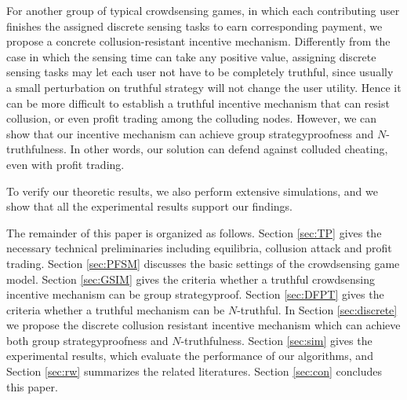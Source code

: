 \documentclass[conference]{IEEEtran}
\theoremstyle{definition}
\begin{document}
\bolditem For another group of typical crowdsensing games, in which each contributing user finishes the assigned discrete sensing tasks to earn corresponding payment, we propose a concrete collusion-resistant incentive mechanism. %
{\color{black}Differently from the case in which the sensing time can take any positive value, assigning discrete sensing tasks may let each user not have to be completely truthful, since usually a small perturbation on truthful strategy will not change the user utility. Hence it can be more difficult to establish a truthful incentive mechanism that can resist collusion, or even profit trading among the colluding nodes. 
However, we can show that our incentive mechanism can achieve group strategyproofness and $N$-truthfulness. In other words, our solution can defend against colluded cheating, even with profit trading.}


\bolditem To verify our theoretic results, we also perform extensive simulations, and we show that all the experimental results support our findings.

{\color{black}
The remainder of this paper is organized as follows. Section \ref{sec:TP} gives the necessary technical preliminaries including equilibria, collusion attack and profit trading. Section \ref{sec:PFSM} discusses the basic settings of the crowdsensing game model. Section \ref{sec:GSIM} gives the criteria whether a truthful crowdsensing incentive mechanism can be group strategyproof. Section \ref{sec:DFPT} gives the criteria whether a truthful mechanism can be $N$-truthful. 
In Section \ref{sec:discrete} we propose the discrete collusion resistant incentive mechanism which can achieve both group strategyproofness and $N$-truthfulness. 
Section \ref{sec:sim} gives the experimental results, which evaluate the performance of our algorithms, and Section \ref{sec:rw} summarizes the related literatures. Section \ref{sec:con} concludes this paper.
}
\end{document}
